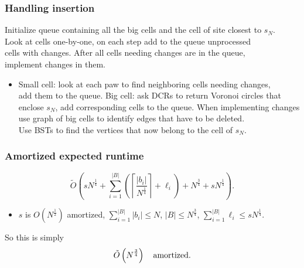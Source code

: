 \begin{frame} \frametitle{Handling insertion}
\begin{block}{\vspace*{-3ex}}
	Initialize queue containing all the big cells and the cell of site closest to $s_N$. \\
	Look at cells one-by-one, on each step add to the queue unprocessed \\
	cells with changes. After all cells needing changes are in the queue, \\
	implement changes in them.
\end{block} \bigskip

\begin{itemize}
	\item Small cell: look at each paw to find neighboring cells needing changes, \\
	    add them to the queue.
	\mitem Big cell: ask DCRs to return Voronoi circles that enclose $s_N$, add
	    corresponding cells to the queue. When implementing changes \\
	    use graph of big cells to identify edges that have to be deleted. \\
	    Use BSTs to find the vertices that now belong to the cell of $s_N$.
\end{itemize} \vspace{7.5mm}
\end{frame}

\def\lrp#1{\left( #1 \right)}
\def\lrc#1{\left\lceil#1\right\rceil}

\begin{frame} \frametitle{Amortized expected runtime}
\def\otl{$\Ot(1)$ } \def\Ot{\tilde O}
\newcommand{\nof}{N^\frac{1}{4}}
\newcommand{\noh}{N^\frac{1}{2}}
\newcommand{\ntf}{N^\frac{3}{4}}

{\small $$
\Ot \lrp{
s\nof +
\sum_{i=1}^{|B|}  \lrp{ \lrc{\frac{|b_i|}{\nof }}+\ell_i}
+ \ntf + s\nof
}.
$$}

\begin{itemize}
	\item $s$ is $O(\noh)$ amortized\hfill{},
	\mitem $\sum_{i=1}^{|B|} |b_i| \leq N$, $|B|\leq \ntf$,
	\mitem $\sum_{i=1}^{|B|} \ell_i \leq s \nof$.
\end{itemize} \bigskip

So this is simply {\large $$\Ot\ll\ntf\rr\quad\text{amortized.}$$}
\vspace{5mm}
\end{frame}
